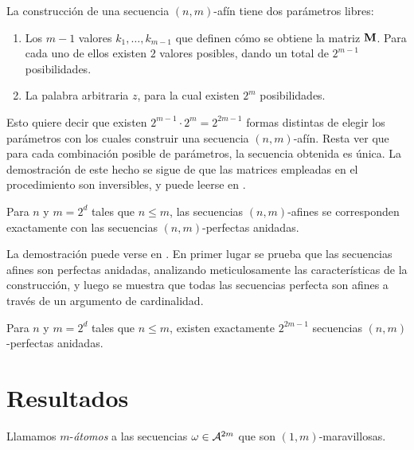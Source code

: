 \begin{demosketch}
  La construcción de una secuencia $(n,m)$-afín tiene dos parámetros libres:
  \begin{enumerate}
    \item Los $m - 1$ valores $k_1,\dots,k_{m - 1}$ que definen cómo se
          obtiene la matriz $\mathbf{M}$. Para cada uno de ellos existen $2$
          valores posibles, dando un total de $2^{m - 1}$ posibilidades.
    \item La palabra arbitraria $z$, para la cual existen $2^m$
          posibilidades.
  \end{enumerate}
  Esto quiere decir que existen $2^{m - 1}\cdot2^m = 2^{2m - 1}$
  formas distintas de elegir los parámetros con los cuales construir una
  secuencia $(n,m)$-afín. Resta ver que para cada combinación posible de
  parámetros, la secuencia obtenida es única. La demostración de este hecho se
  sigue de que las matrices empleadas en el procedimiento son inversibles,
  y puede leerse en \cite{BECHER2019101403}.
\end{demosketch}

\begin{teo}
  Para $n$ y $m = 2^d$ tales que $n \leq m$, las secuencias $(n,m)$-afines se
  corresponden exactamente con las secuencias $(n,m)$-perfectas anidadas.
\end{teo}

\begin{demosketch}
  La demostración puede verse en \cite{BECHER2019101403}. En primer lugar se
  prueba que las secuencias afines son perfectas anidadas, analizando
  meticulosamente las características de la construcción, y luego se muestra
  que todas las secuencias perfecta son afines a través de un argumento de
  cardinalidad.
\end{demosketch}

\begin{coro}
  Para $n$ y $m = 2^d$ tales que $n \leq m$, existen exactamente $2^{2m - 1}$
  secuencias $(n,m)$-perfectas anidadas.
\end{coro}

\section{Resultados}

\begin{defi}
  Llamamos $m$-\emph{átomos} a las secuencias $\omega \in \mathcal{A}^{2m}$ que
  son $(1,m)$-maravillosas.
\end{defi}

